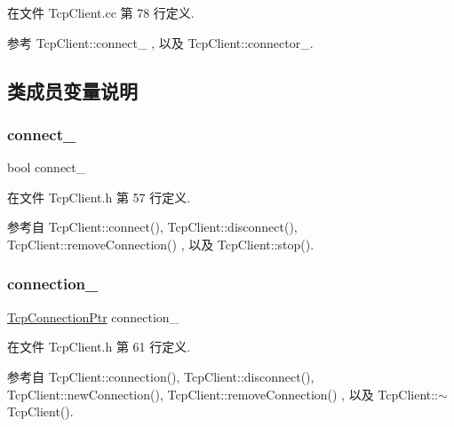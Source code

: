 在文件 Tcp\+Client.\+cc 第 78 行定义.



参考 Tcp\+Client\+::connect\+\_\+ , 以及 Tcp\+Client\+::connector\+\_\+.



\subsection{类成员变量说明}
\mbox{\label{classmuduo_1_1TcpClient_ab4b9ce5dfde7fe6c5954a376aac00190}} 
\subsubsection{\texorpdfstring{connect\+\_\+}{connect\_}}
{\footnotesize\ttfamily bool connect\+\_\+\hspace{0.3cm}{\ttfamily [private]}}



在文件 Tcp\+Client.\+h 第 57 行定义.



参考自 Tcp\+Client\+::connect(), Tcp\+Client\+::disconnect(), Tcp\+Client\+::remove\+Connection() , 以及 Tcp\+Client\+::stop().

\mbox{\label{classmuduo_1_1TcpClient_a0d47bb0fac19c8a5d569761e100a0a47}} 
\subsubsection{\texorpdfstring{connection\+\_\+}{connection\_}}
{\footnotesize\ttfamily \hyperlink{namespacemuduo_a40c45128e9700d337d92f3cbb8dd4a0a}{Tcp\+Connection\+Ptr} connection\+\_\+\hspace{0.3cm}{\ttfamily [private]}}



在文件 Tcp\+Client.\+h 第 61 行定义.



参考自 Tcp\+Client\+::connection(), Tcp\+Client\+::disconnect(), Tcp\+Client\+::new\+Connection(), Tcp\+Client\+::remove\+Connection() , 以及 Tcp\+Client\+::$\sim$\+Tcp\+Client().


